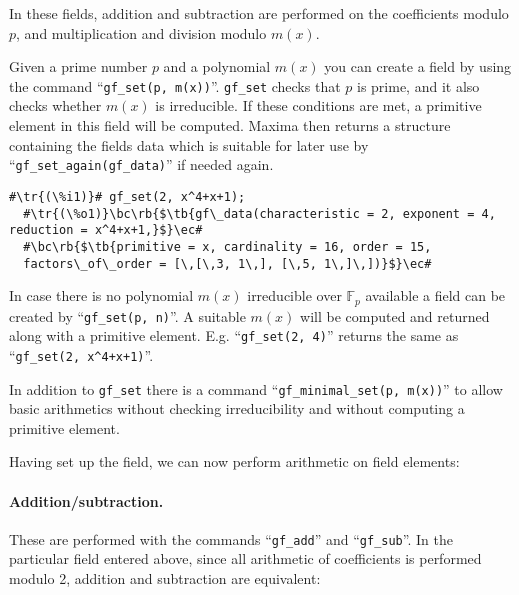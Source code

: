 \documentclass[a4paper,11pt,leqno,fleqn]{artikel3}
\newcommand{\bc}{\begin{center}}
\newcommand{\ec}{\end{center}}
\newcommand{\tr}[1]{\textcolor{red}{#1}}
\newcommand{\tb}[1]{\textcolor{blue}{#1}}
\newcommand{\rb}[1]{\raisebox{2mm}[0mm][1mm]{#1}}
\begin{document}
In these fields, addition and subtraction are performed on the coefficients
modulo $p$, and multiplication and division modulo $m(x)$.

Given a prime number $p$ and a polynomial $m(x)$ 
you can create a field by using the command ``\verb!gf_set(p, m(x))!''.
\verb!gf_set! checks that $p$ is prime, and it also checks 
whether $m(x)$ is irreducible. If these conditions are met, 
a primitive element in this field will be computed. 
Maxima then returns a structure containing the fields data which is 
suitable for later use by ``\verb!gf_set_again(gf_data)!'' if needed again.

%
\vspace*{2mm}
\begin{lstlisting}[escapechar=\#]
  #\tr{(\%i1)}# gf_set(2, x^4+x+1);
  #\tr{(\%o1)}\bc\rb{$\tb{gf\_data(characteristic = 2, exponent = 4, reduction = x^4+x+1,}$}\ec#
  #\bc\rb{$\tb{primitive = x, cardinality = 16, order = 15, 
  factors\_of\_order = [\,[\,3, 1\,], [\,5, 1\,]\,])}$}\ec#
\end{lstlisting}

In case there is no polynomial $m(x)$ irreducible over $\mathbb{F}_p$ available 
a field can be created by ``\verb!gf_set(p, n)!''. 
A suitable $m(x)$ will be computed and returned along with a primitive element. 
E.g. ``\verb!gf_set(2, 4)!'' returns the same as ``\verb!gf_set(2, x^4+x+1)!''.

In addition to \verb!gf_set! there is a command ``\verb!gf_minimal_set(p, m(x))!'' 
to allow basic arithmetics without checking irreducibility and 
without computing a primitive element.


\bigskip

Having set up the field, we can now perform arithmetic on field elements:


\paragraph{Addition/subtraction.}

These are performed with the commands ``\verb!gf_add!'' and ``\verb!gf_sub!''.
In the particular field entered above, since all arithmetic of coefficients is
performed modulo 2, addition and subtraction are equivalent:
\end{document}
